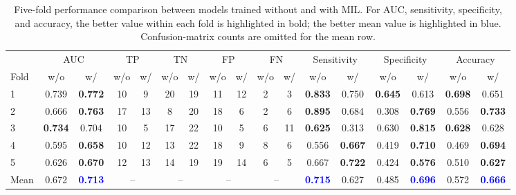\documentclass[a4paper]{article}
\begin{document}
\begin{table}[!h]
\centering
\footnotesize
\setlength{\tabcolsep}{2.8pt}
\renewcommand{\arraystretch}{1.12}

\begin{adjustbox}{max width=\linewidth}
\begin{tabular}{l *{16}{c}}
\toprule
 & \multicolumn{2}{c}{AUC}
 & \multicolumn{2}{c}{TP}
 & \multicolumn{2}{c}{TN}
 & \multicolumn{2}{c}{FP}
 & \multicolumn{2}{c}{FN}
 & \multicolumn{2}{c}{Sensitivity}
 & \multicolumn{2}{c}{Specificity}
 & \multicolumn{2}{c}{Accuracy} \\
\cmidrule(lr){2-3}\cmidrule(lr){4-5}\cmidrule(lr){6-7}\cmidrule(lr){8-9}
\cmidrule(lr){10-11}\cmidrule(lr){12-13}\cmidrule(lr){14-15}\cmidrule(lr){16-17}
Fold & w/o & w/ & w/o & w/ & w/o & w/ & w/o & w/ & w/o & w/ & w/o & w/ & w/o & w/ & w/o & w/ \\
\midrule
1 & 0.739 & \textbf{0.772}
  & 10 & 9
  & 20 & 19
  & 11 & 12
  & 2 & 3
  & \textbf{0.833} & 0.750
  & \textbf{0.645} & 0.613
  & \textbf{0.698} & 0.651 \\
2 & 0.666 & \textbf{0.763}
  & 17 & 13
  & 8 & 20
  & 18 & 6
  & 2 & 6
  & \textbf{0.895} & 0.684
  & 0.308 & \textbf{0.769}
  & 0.556 & \textbf{0.733} \\
3 & \textbf{0.734} & 0.704
  & 10 & 5
  & 17 & 22
  & 10 & 5
  & 6 & 11
  & \textbf{0.625} & 0.313
  & 0.630 & \textbf{0.815}
  & \textbf{0.628} & 0.628 \\
4 & 0.595 & \textbf{0.658}
  & 10 & 12
  & 13 & 22
  & 18 & 9
  & 8 & 6
  & 0.556 & \textbf{0.667}
  & 0.419 & \textbf{0.710}
  & 0.469 & \textbf{0.694} \\
5 & 0.626 & \textbf{0.670}
  & 12 & 13
  & 14 & 19
  & 19 & 14
  & 6 & 5
  & 0.667 & \textbf{0.722}
  & 0.424 & \textbf{0.576}
  & 0.510 & \textbf{0.627} \\
\midrule
Mean & 0.672 & \textcolor{blue}{\textbf{0.713}}
     & \multicolumn{2}{c}{--}
     & \multicolumn{2}{c}{--}
     & \multicolumn{2}{c}{--}
     & \multicolumn{2}{c}{--}
     & \textcolor{blue}{\textbf{0.715}} & 0.627
     & 0.485 & \textcolor{blue}{\textbf{0.696}}
     & 0.572 & \textcolor{blue}{\textbf{0.666}} \\
\bottomrule
\end{tabular}
\end{adjustbox}
\caption{Five-fold performance comparison between models trained without and with MIL. For AUC, sensitivity, specificity, and accuracy, the better value within each fold is highlighted in bold; the better mean value is highlighted in blue. Confusion-matrix counts are omitted for the mean row.}
\label{tab:mil_cv_results}
\end{table}
\vspace{-1.0em}
\end{document}
